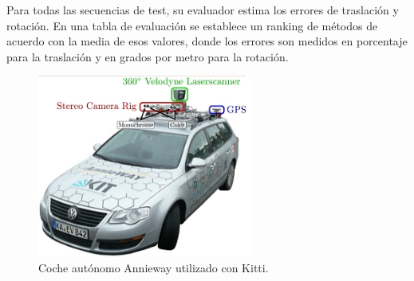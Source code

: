 \begin {enumerate}
Para todas las secuencias de test, su evaluador estima los errores de traslación y rotación. En una tabla de evaluación se establece un ranking de métodos de acuerdo con la media de esos valores, donde los errores son medidos en porcentaje para la traslación y en grados por metro para la rotación.
\begin{figure}[H]
\begin{center}
\includegraphics[height=6.0cm]{img/cap4/kittiCar.png}
\end{center}
\caption{Coche autónomo Annieway utilizado con Kitti.}
\end{figure}

\end {enumerate}



\clearpage
\newpage
\pagebreak










